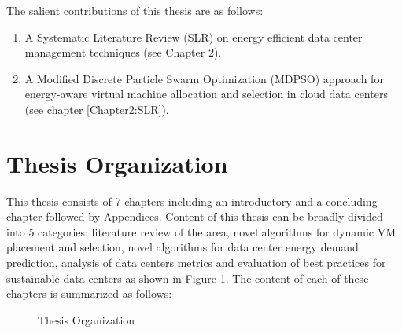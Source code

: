 \documentclass[review]{elsarticle}
\begin{document}
The salient contributions of this thesis are as follows:
\begin{enumerate}
	\item A Systematic Literature Review (SLR) on energy efficient data center management techniques (see Chapter 2).
	\item A Modified  Discrete Particle Swarm Optimization (MDPSO)  approach for energy-aware virtual machine allocation and selection in cloud data centers (see chapter \ref{Chapter2:SLR}).

\end{enumerate}

\section{Thesis Organization}
This thesis consists of 7 chapters including an introductory and a concluding chapter followed by Appendices. Content of this thesis can be broadly divided into 5 categories: literature review of the area, novel algorithms for dynamic VM placement and selection, novel algorithms for data center energy demand prediction, analysis of data centers metrics and evaluation of best practices for sustainable data centers as shown in Figure \ref{org}. The content of each of these chapters is summarized as follows:
\begin{figure}[h]
	\centering
	\caption{Thesis Organization}
	\label{org}
\end{figure}
\end{document}
